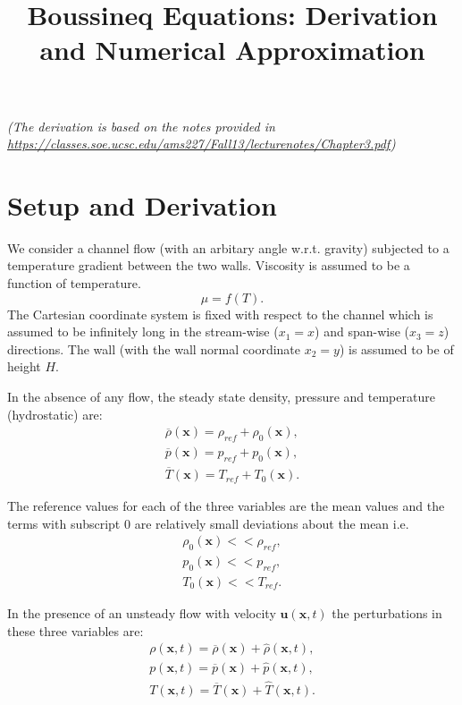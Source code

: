 \documentclass[preprint,12pt]{article}
\title{\vspace{-0.75in}Boussineq Equations: Derivation and Numerical Approximation\vspace{-0.5in}}
\begin{document}
\maketitle	
\vspace{-0.3in}
\emph{(The derivation is based on the notes provided in \url{https://classes.soe.ucsc.edu/ams227/Fall13/lecturenotes/Chapter3.pdf})}
\section{Setup and Derivation}
We consider a channel flow (with an arbitary angle w.r.t. gravity) subjected to a temperature gradient between the two walls. Viscosity is assumed to be a function of temperature. 
\begin{equation}
\mu=f(T).
\end{equation}
The Cartesian coordinate system is fixed with respect to the channel which is assumed to be infinitely long in the stream-wise ($x_1=x$) and span-wise ($x_3=z$) directions. The wall (with the wall normal coordinate $x_2=y$) is assumed to be of height $H$. 

In the absence of any flow, the steady state density, pressure and temperature (hydrostatic) are:
\begin{subequations}\begin{eqnarray}
{\overline{\rho}(\mathbf{x})}=\rho_{ref}+\rho_0(\mathbf{x}),\\
{\overline{p}(\mathbf{x})}=p_{ref}+p_0(\mathbf{x}),\\
{\overline{T}(\mathbf{x})}=T_{ref}+T_0(\mathbf{x}).
\end{eqnarray}\end{subequations}

The reference values for each of the three variables are the mean values and the terms with subscript $0$ are relatively small deviations about the mean i.e.
\begin{subequations}\begin{eqnarray}
\rho_0(\mathbf{x})<<\rho_{ref},\\
p_0(\mathbf{x})<<p_{ref},\\
T_0(\mathbf{x})<<T_{ref}.
\end{eqnarray}\end{subequations}

In the presence of an unsteady flow with velocity $\mathbf{u}(\mathbf{x},t)$ the perturbations in these three variables are:
\begin{subequations}\begin{eqnarray}
\rho(\mathbf{x},t)=	{\overline{\rho}(\mathbf{x})}+\hat{\rho}(\mathbf{x},t),\\
p(\mathbf{x},t)=	{\overline{p}(\mathbf{x})}+\hat{p}(\mathbf{x},t),\\
T(\mathbf{x},t)=	{\overline{T}(\mathbf{x})}+\hat{T}(\mathbf{x},t).
	\end{eqnarray}\end{subequations}
\end{document}
